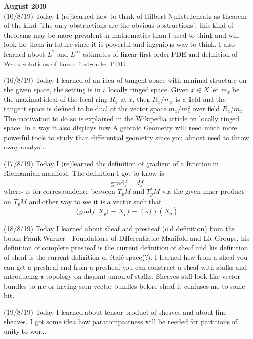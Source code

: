 \documentclass[12pt,a4paper]{article}
\begin{document}
\maketitle\textbf{August 2019}
\\


(10/8/19) Today I (re)learned how to think of Hilbert Nullstellensatz as theorem of the kind 'The only obstructions are the obvious obstructions', this kind of theorems may be more prevalent in mathematics than I used to think and will look for them in future since it is powerful and ingenious way to think. I also learned about $L^2$ and $L^{\infty}$ estimates of linear first-order PDE and definition of Weak solutions of linear first-order PDE.

(16/8/19) Today I learned of an idea of tangent space with minimal structure on the given space, the setting is in a locally ringed space. Given $x\in X$ let $m_x$ be the maximal ideal of the local ring $R_x$ at $x$, then $R_x/m_x$ is a field and the tangent space is defined to be dual of the vector space $m_x/m_x^2$ over field $R_x/m_x$. The motivation to do so is explained in the Wikipedia article on locally ringed space. In a way it also displays how Algebraic Geometry will need much more powerful tools to study than differential geometry since you almost need to throw away analysis.

(17/8/19) Today I (re)learned the definition of gradient of a function in Riemannian manifold. The definition I got to know is $$\text{grad} f = \tilde{df}$$ where $\tilde{}$  is for correspondence between $T_pM$ and $T^*_pM$ via the given inner product on $T_pM$ and other way to see it is a vector such that 
$$\langle \text{grad}f, X_p \rangle = X_pf = (df)(X_p)$$

(18/8/19) Today I learned about sheaf and presheaf (old definition) from the books Frank Warner - Foundations of Differentiable Manifold and Lie Groups, his definition of complete presheaf is the current definition of sheaf and his definition of sheaf is the current definition of \'{e}tal\'{e} space(?). I learned how from a sheaf you can get a presheaf and from a presheaf you can construct a sheaf with stalks and introducing a topology on disjoint union of stalks. Sheaves still look like vector bundles to me or having seen vector bundles before sheaf it confuses me to some bit.

(19/8/19) Today I learned about tensor product of sheaves and about fine sheaves. I got some idea how paracompactness will be needed for partitions of unity to work.
\end{document}
